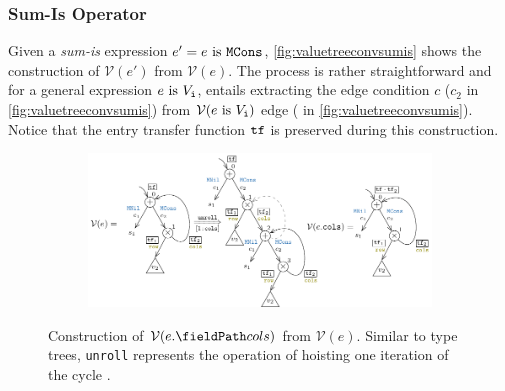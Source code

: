 \subsubsection{Sum-Is Operator}
Given a {\em sum-is} expression $e' = e\ \mathrm{is}\ {\tt MCons}$,
\cref{fig:valuetreeconvsumis} shows the construction of $\mathcal{V}(e')$
from $\mathcal{V}(e)$.
The process is rather straightforward and for a general expression $e\ \mathrm{is}\ {\tt \mathnormal{V}_i}$, entails extracting the
edge condition $c$ ($c_2$ in \cref{fig:valuetreeconvsumis}) from $\mathcal{V}(e\ \mathrm{is}\ {\tt \mathnormal{V}_i})$ edge
 ( in \cref{fig:valuetreeconvsumis}).
Notice that the entry transfer function ${\tt tf}{}$ is preserved during this construction.

\begin{figure}[t!]
\begin{subfigure}[b]{\textwidth}
\begin{center}
\includegraphics[scale=1.2]{chapters/figures/figValueTreeConvProdAccess.pdf}
\end{center}
\end{subfigure}
\vspace{5px}
\caption{\label{fig:valuetreeconvprodaccess}Construction of $\mathcal{V}(\prodAccess{e}{cols})$ from $\mathcal{V}(e)$.
Similar to type trees, {\tt unroll}  represents the operation of hoisting one iteration of the cycle .}
\end{figure}

